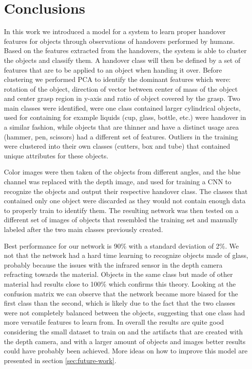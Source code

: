 \section{Conclusions}

In this work we introduced a model for a system to learn proper handover features for objects through observations of handovers performed by humans. Based on the features extracted from the handovers, the system is able to cluster the objects and classify them. A handover class will then be defined by a set of features that are to be applied to an object when handing it over. Before clustering we performed PCA to identify the dominant features which were: rotation of the object, direction of vector between center of mass of the object and center grasp region in y-axis and ratio of object covered by the grasp. Two main classes were identified, were one class contained larger cylindrical objects, used for containing for example liquids (cup, glass, bottle, etc.) were handover in a similar fashion, while objects that are thinner and have a distinct usage area (hammer, pen, scissors) had a different set of features. Outliers in the training were clustered into their own classes (cutters, box and tube) that contained unique attributes for these objects.

Color images were then taken of the objects from different angles, and the blue channel was replaced with the depth image, and used for training a CNN to recognize the objects and output their respective handover class. The classes that contained only one object were discarded as they would not contain enough data to properly train to identify them. The resulting network was then tested on a different set of images of objects that resembled the training set and manually labeled after the two main classes previously created.

Best performance for our network is 90\% with a standard deviation of 2\%. We not that the network had a hard time learning to recognize objects made of glass, probably because the issues with the infrared sensor in the depth camera refracting towards the material. Objects in the same class but made of other material had results close to 100\% which confirms this theory. Looking at the confusion matrix we can observe that the network became more biased for the first class than the second, which is likely due to the fact that the two classes were not completely balanced between the objects, suggesting that one class had more versatile features to learn from. In overall the results are quite good considering the small dataset to train on and the artifacts that are created with the depth camera, and with a larger amount of objects and images better results could have probably been achieved. More ideas on how to improve this model are presented in section \ref{sec:future-work}.


